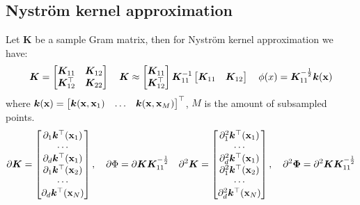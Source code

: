 \subsection{Nystr\"{o}m kernel approximation}
\label{sec:Nystrom}
Let ${\bm K}$ be a sample Gram matrix, then for Nystr\"{o}m kernel approximation \cite{Chen2016ErrorAO} we have:
\[
    {\bm K} =
    \begin{bmatrix}
        {\bm K}_{11} & {\bm K}_{12}\\
        {\bm K}_{12}^{\top} & {\bm K}_{22}
    \end{bmatrix}
    \quad
    {\bm K} \approx
    \begin{bmatrix}
        {\bm K}_{11}\\
        {\bm K}_{12}^{\top}
    \end{bmatrix}
    {\bm K}_{11}^{-1}
    \begin{bmatrix}
        {\bm K}_{11} & {\bm K}_{12}
    \end{bmatrix}
    \quad
    \phi(x) =
    {\bm K}_{11}^{-\frac{1}{2}}{\bm k}({\bf x})
\]
where ${\bm k}({\bf x}) = \begin{bmatrix} {\bm k}({\bf x}, {\bf x}_1) & \ldots & {\bm k}({\bf x}, {\bf x}_M)\end{bmatrix}^{\top}$, $M$ is the amount of subsampled points.
\[
    \partial {\bm K} = \begin{bmatrix}
        \partial_1 {\bm k}^\top({\bf x}_1) \\
        \cdots \\
        \partial_d {\bm k}^\top({\bf x}_1) \\
        \partial_1 {\bm k}^\top({\bf x}_2) \\
        \cdots \\
        \partial_d {\bm k}^\top({\bf x}_N)
    \end{bmatrix},
    \quad
    \partial \Phi = \partial {\bm K} {\bm K}_{11}^{-\frac{1}{2}}
    \quad
    \partial^2 {\bm K} = \begin{bmatrix}
        \partial_1^2 {\bm k}^\top({\bf x}_1) \\
        \cdots \\
        \partial_d^2 {\bm k}^\top({\bf x}_1) \\
        \partial_1^2 {\bm k}^\top({\bf x}_2) \\
        \cdots \\
        \partial_d^2 {\bm k}^\top({\bf x}_N)
    \end{bmatrix},
    \quad
    \partial^2 {\bm \Phi} = \partial^2 {\bm K} {\bm K}_{11}^{-\frac{1}{2}}
\]
